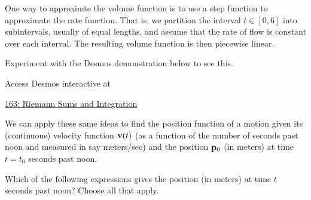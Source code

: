\documentclass{ximera}
\begin{document}
One way to approximte the volume function is to use a step function to approximate the rate function. That is, we partition the interval $t\in [0,6]$ into subintervals, usually of equal lengths, and assume that the rate of flow is constant over each interval. The resulting volume function is then piecewise linear. 

Experiment with the Desmos demonstration below to see this.

Access Desmos interactive at
 
\href{https://https://www.desmos.com/calculator/zswxfftnnk}{163: Riemann Sums and Integration}

 
\begin{onlineOnly}
    \begin{center}
\end{center}
\end{onlineOnly}




\begin{question}    \label{Qedtrg78}
We can apply these same ideas to find the position function of a motion given its (continuous) velocity function ${\bf v}(t)$ (as a function of the number of seconds past noon and measured in say meters/sec) and the position ${\bf p}_0$ (in meters) at time $t=t_0$ seconds past noon.  

Which of the following expressions gives the position (in meters) at time $t$ seconds past noon? Choose all that apply.
\begin{selectAll}  
  \end{selectAll}
\end{question}
\end{document}
